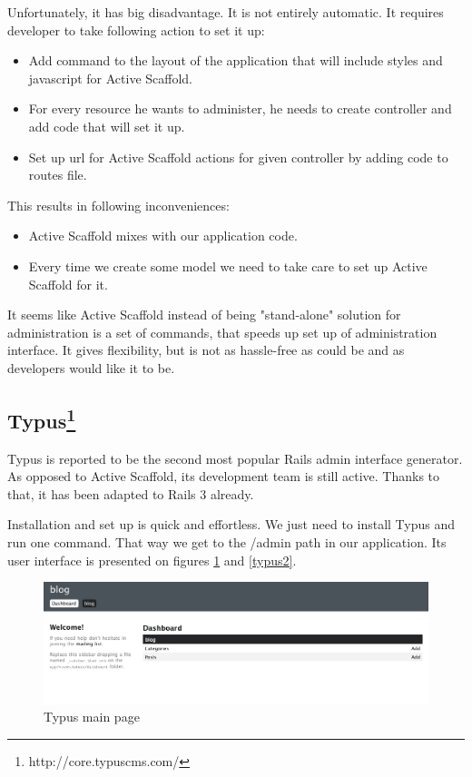     Unfortunately, it has big disadvantage. It is not entirely automatic. It requires developer to take following action to set it up:
    
    \begin{itemize}
      \item Add command to the layout of the application that will include styles and javascript for Active Scaffold.
      \item For every resource he wants to administer, he needs to create controller and add code that will set it up.
      \item Set up url for Active Scaffold actions for given controller by adding code to routes file.
    \end{itemize}

    This results in following inconveniences:
    
    \begin{itemize}
      \item Active Scaffold mixes with our application code.
      \item Every time we create some model we need to take care to set up Active Scaffold for it.
    \end{itemize}
    
    It seems like Active Scaffold instead of being "stand-alone" solution for administration is a set of commands, that speeds up set up of administration interface. It gives flexibility, but is not as hassle-free as could be and as developers would like it to be.
    
    \subsection[Typus] {Typus\footnote{http://core.typuscms.com/}}
    Typus is reported to be the second most popular Rails admin interface generator. As opposed to Active Scaffold, its development team is still active. Thanks to that, it has been adapted to Rails 3 already.
    
    Installation and set up is quick and effortless. We just need to install Typus and run one command. That way we get to the /admin path in our application. Its user interface is presented on figures \ref{typus1} and \ref{typus2}.
    
    \begin{figure}[hbt!]
  		\begin{center}
  			\includegraphics[width=\linewidth]{images/chapter01/typus1.png}
  			\caption{Typus main page}
  			\label{typus1}
  		\end{center}
  	\end{figure}
  	
